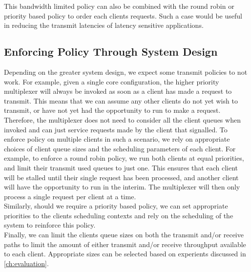 This bandwidth limited policy can also be combined with the round robin or priority based policy
to order each clients requests. Such a case would be useful in reducing the 
transmit latencies of latency sensitive applications.\\ 


\subsection{Enforcing Policy Through System Design}
Depending on the greater system design, we expect some transmit policies to not work.
For example, given a single core configuration, the higher priority multiplexer will
always be invoked as soon as a client has made a request to transmit. This means that
we can assume any other clients do not yet wish to transmit, or have not yet had the
opportunity to run to make a request. Therefore, the multiplexer does not need to 
consider all the client queues when invoked and can just service requests made
by the client that signalled. To enforce policy on multiple clients in such a scenario,
we rely on appropriate choices of client queue sizes and the scheduling parameters
of each client. For example, to enforce a round robin policy, we run both clients
at equal priorities, and limit their transmit used queues to just one. This ensures
that each client will be stalled until their single request has been processed, and
another client will have the opportunity to run in the interim. The multiplexer will
then only process a single request per client at a time.\\
Similarly, should we require a priority based policy, we can set appropriate priorities
to the clients scheduling contexts and rely on the scheduling of the system to reinforce
this policy.\\
Finally, we can limit the clients queue sizes on both the transmit and/or receive paths
to limit the amount of either transmit and/or receive throughput available to each client.
Appropriate sizes can be selected based on experients discussed in \autoref{ch:evaluation}.\\ 

